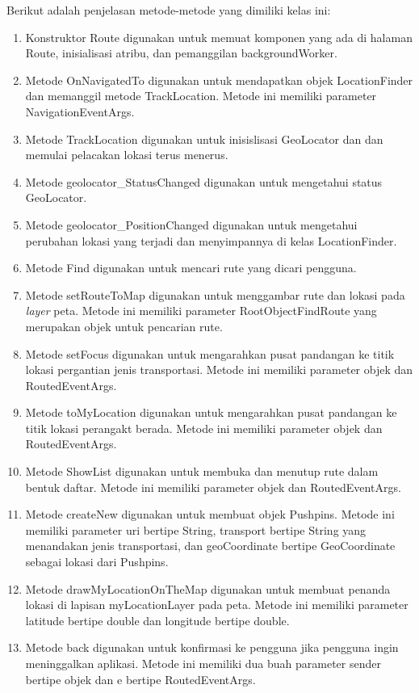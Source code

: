 Berikut adalah penjelasan metode-metode yang dimiliki kelas ini:
\begin{enumerate}
	\item Konstruktor Route digunakan untuk memuat komponen yang ada di halaman Route, inisialisasi atribu, dan pemanggilan backgroundWorker.
	\item Metode OnNavigatedTo digunakan untuk mendapatkan objek LocationFinder dan memanggil metode TrackLocation. Metode ini memiliki parameter NavigationEventArgs.
	\item Metode TrackLocation digunakan untuk inisislisasi GeoLocator dan dan memulai pelacakan lokasi terus menerus. 
	\item Metode geolocator\_StatusChanged digunakan untuk mengetahui status GeoLocator.
	\item Metode geolocator\_PositionChanged digunakan untuk mengetahui perubahan lokasi yang terjadi dan menyimpannya di kelas LocationFinder.
	\item Metode Find digunakan untuk mencari rute yang dicari pengguna.
	\item Metode setRouteToMap digunakan untuk menggambar rute dan lokasi pada \textit{layer} peta. Metode ini memiliki parameter RootObjectFindRoute yang merupakan objek untuk pencarian rute.
	\item Metode setFocus digunakan untuk mengarahkan pusat pandangan ke titik lokasi pergantian jenis transportasi. Metode ini memiliki parameter objek dan RoutedEventArgs.
	\item Metode toMyLocation digunakan untuk mengarahkan pusat pandangan ke titik lokasi perangakt berada. Metode ini memiliki parameter objek dan RoutedEventArgs.
	\item Metode ShowList digunakan untuk membuka dan menutup rute dalam bentuk daftar. Metode ini memiliki parameter objek dan RoutedEventArgs.
	\item Metode createNew digunakan untuk membuat objek Pushpins. Metode ini memiliki parameter uri bertipe String, transport bertipe String yang menandakan jenis transportasi, dan geoCoordinate bertipe GeoCoordinate sebagai lokasi dari Pushpins.
	\item Metode drawMyLocationOnTheMap digunakan untuk membuat penanda lokasi di lapisan myLocationLayer pada peta. Metode ini memiliki parameter latitude bertipe double dan longitude bertipe double.
	\item Metode back digunakan untuk konfirmasi ke pengguna jika pengguna ingin meninggalkan aplikasi. Metode ini memiliki dua buah parameter sender bertipe objek dan e bertipe RoutedEventArgs.

\end{enumerate}
